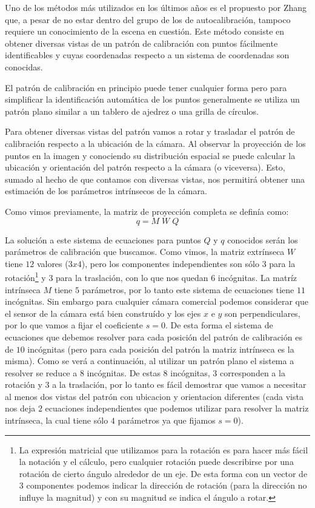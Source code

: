 Uno de los métodos más utilizados en los últimos años es el propuesto por Zhang \cite{zhang2000flexible} que, a pesar de no estar dentro del grupo de los de autocalibración, tampoco requiere un conocimiento de la escena en cuestión. Este método consiste en obtener diversas vistas de un patrón de calibración con puntos fácilmente identificables y cuyas coordenadas respecto a un sistema de coordenadas son conocidas. 

El patrón de calibración en principio puede tener cualquier forma pero para simplificar la identificación automática de los puntos generalmente se utiliza un patrón plano similar a un tablero de ajedrez o una grilla de círculos.

Para obtener diversas vistas del patrón vamos a rotar y trasladar el patrón de calibración respecto a la ubicación de la cámara. Al observar la proyección de los puntos en la imagen y conociendo su distribución espacial se puede calcular la ubicación y orientación del patrón respecto a la cámara (o viceversa). Esto, sumado al hecho de que contamos con diversas vistas, nos permitirá obtener una estimación de los parámetros intrínsecos de la cámara.

Como vimos previamente, la matriz de proyección completa se definía como:
\begin{equation*}
	q = M \; W \; Q
\end{equation*}
	
La solución a este sistema de ecuaciones para puntos $Q$ y $q$ conocidos serán los parámetros de calibración que buscamos. Como vimos, la matriz extrínseca $W$ tiene $12$ valores ($3x4$), pero los componentes independientes son sólo $3$ para la rotación\footnote{La expresión matricial que utilizamos para la rotación es para hacer más fácil la notación y el cálculo, pero cualquier rotación puede describirse por una rotación de cierto ángulo alrededor de un eje. De esta forma con un vector de $3$ componentes podemos indicar la dirección de rotación (para la dirección no influye la magnitud) y con su magnitud se indica el ángulo a rotar.} y $3$ para la traslación, con lo que nos quedan $6$ incógnitas.
La matríz intrínseca $M$ tiene $5$ parámetros, por lo tanto este sistema de ecuaciones tiene $11$ incógnitas. Sin embargo para cualquier cámara comercial podemos considerar que el sensor de la cámara está bien construído y los ejes $x$ e $y$ son perpendiculares, por lo que vamos a fijar el coeficiente $s = 0$. De esta forma el sistema de ecuaciones que debemos resolver para cada posición del patrón de calibración es de $10$ incógnitas (pero para cada posición del patrón la matriz intrínseca es la misma). Como se verá a continuación, al utilizar un patrón plano el sistema a resolver se reduce a $8$ incógnitas. De estas $8$ incógnitas, $3$ corresponden a la rotación y $3$ a la traslación, por lo tanto es fácil demostrar que vamos a necesitar al menos dos vistas del patrón con ubicacion y orientacion diferentes (cada vista nos deja $2$ ecuaciones independientes que podemos utilizar para resolver la matriz intrínseca, la cual tiene sólo $4$ parámetros ya que fijamos $s=0$).

